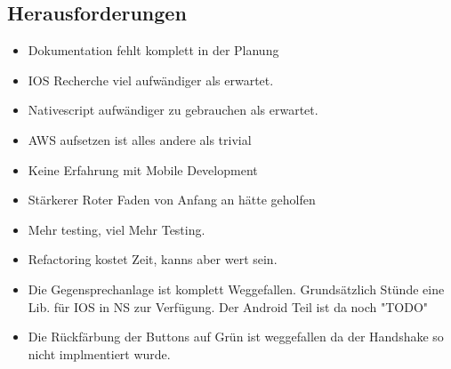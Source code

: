 \subsection{Herausforderungen}
\begin{itemize}
    \item Dokumentation fehlt komplett in der Planung
    \item IOS Recherche viel aufwändiger als erwartet.
    \item Nativescript aufwändiger zu gebrauchen als erwartet.
    \item AWS aufsetzen ist alles andere als trivial
    \item Keine Erfahrung mit Mobile Development
    \item Stärkerer Roter Faden von Anfang an hätte geholfen
    \item Mehr testing, viel Mehr Testing.
    \item Refactoring kostet Zeit, kanns aber wert sein.
\end{itemize}

\begin{itemize}
    \item Die Gegensprechanlage ist komplett Weggefallen.
    \subitem Grundsätzlich Stünde eine Lib. für IOS in NS zur Verfügung. Der Android Teil ist da noch "TODO"
    \item Die Rückfärbung der Buttons auf Grün ist weggefallen da der Handshake so nicht implmentiert wurde.
\end{itemize}
